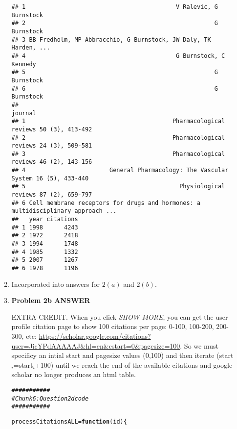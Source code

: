 \documentclass{article}\usepackage[]{graphicx}\usepackage[]{color}
\makeatletter
\newcommand{\hlcom}[1]{\textcolor[rgb]{0.678,0.584,0.686}{\textit{#1}}}%
\newcommand{\hlstd}[1]{\textcolor[rgb]{0.345,0.345,0.345}{#1}}%
\newcommand{\hlkwa}[1]{\textcolor[rgb]{0.161,0.373,0.58}{\textbf{#1}}}%
\newcommand{\hlkwb}[1]{\textcolor[rgb]{0.69,0.353,0.396}{#1}}%
\newcommand{\hlkwc}[1]{\textcolor[rgb]{0.333,0.667,0.333}{#1}}%
\newenvironment{kframe}{%
 \def\at@end@of@kframe{}%
 \ifinner\ifhmode%
  \def\at@end@of@kframe{\end{minipage}}%
  \begin{minipage}{\columnwidth}%
 \fi\fi%
 \def\FrameCommand##1{\hskip\@totalleftmargin \hskip-\fboxsep
 \colorbox{shadecolor}{##1}\hskip-\fboxsep
     \hskip-\linewidth \hskip-\@totalleftmargin \hskip\columnwidth}%
 \MakeFramed {\advance\hsize-\width
   \@totalleftmargin\z@ \linewidth\hsize
   \@setminipage}}%
 {\par\unskip\endMakeFramed%
 \at@end@of@kframe}
\newenvironment{knitrout}{}{} %
\makeatother
\begin{document}
\begin{enumerate}
\begin{enumerate}
\begin{knitrout}
\begin{kframe}
\begin{verbatim}
## 1                                           V Ralevic, G Burnstock
## 2                                                      G Burnstock
## 3 BB Fredholm, MP Abbracchio, G Burnstock, JW Daly, TK Harden, ...
## 4                                           G Burnstock, C Kennedy
## 5                                                      G Burnstock
## 6                                                      G Burnstock
##                                                                            journal
## 1                                          Pharmacological reviews 50 (3), 413-492
## 2                                          Pharmacological reviews 24 (3), 509-581
## 3                                          Pharmacological reviews 46 (2), 143-156
## 4                        General Pharmacology: The Vascular System 16 (5), 433-440
## 5                                            Physiological reviews 87 (2), 659-797
## 6 Cell membrane receptors for drugs and hormones: a multidisciplinary approach ...
##   year citations
## 1 1998      4243
## 2 1972      2418
## 3 1994      1748
## 4 1985      1332
## 5 2007      1267
## 6 1978      1196
\end{verbatim}
\end{kframe}
\end{knitrout}

\item Incorporated into answers for $2(a)$ and $2(b)$. %

\item \textbf{Problem 2b ANSWER} %

EXTRA CREDIT. When you click \textit{SHOW MORE}, you can get the user profile citation page to show 100 citations per page: 0-100, 100-200, 200-300, etc: \url{https://scholar.google.com/citations?user=JicYPdAAAAAJ&hl=en&cstart=0&pagesize=100}. So we must specificy an intial start and pagesize values (0,100) and then iterate (start$_i$=start$_i$+100) until we reach the end of the available citations and google scholar no longer produces an html table.

\begin{knitrout}
\color{fgcolor}\begin{kframe}
\begin{alltt}
\hlcom{###########}
\hlcom{# Chunk 6: Question 2d code}
\hlcom{###########}

\hlstd{processCitationsALL} \hlkwb{=} \hlkwa{function}\hlstd{(}\hlkwc{id}\hlstd{) \{}


\end{alltt}
\end{kframe}
\end{knitrout}
\end{enumerate}
\end{enumerate}
\end{document}
